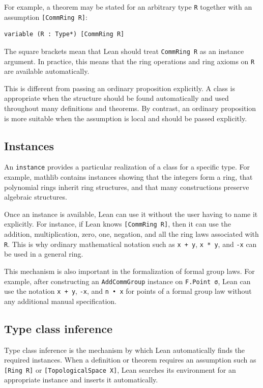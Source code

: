 For example, a theorem may be stated for an arbitrary type
\lstinline|R| together with an assumption \lstinline|[CommRing R]|:
\begin{lstlisting}
variable (R : Type*) [CommRing R]
\end{lstlisting}
The square brackets mean that Lean should treat \lstinline|CommRing R| as
an instance argument.  In practice, this means that the ring operations
and ring axioms on \lstinline|R| are available automatically.

This is different from passing an ordinary proposition explicitly.  A
class is appropriate when the structure should be found automatically and
used throughout many definitions and theorems.  By contrast, an ordinary
proposition is more suitable when the assumption is local and should be
passed explicitly.

\subsection{Instances}

An \lstinline|instance| provides a particular realization of a class for a
specific type.  For example, \textsf{mathlib} contains instances showing
that the integers form a ring, that polynomial rings inherit ring
structures, and that many constructions preserve algebraic structures.

Once an instance is available, Lean can use it without the user having to
name it explicitly.  For instance, if Lean knows \lstinline|[CommRing R]|,
then it can use the addition, multiplication, zero, one, negation, and all
the ring laws associated with \lstinline|R|.  This is why ordinary
mathematical notation such as \lstinline|x + y|, \lstinline|x * y|, and
\lstinline|-x| can be used in a general ring.

This mechanism is also important in the formalization of formal group
laws.  For example, after constructing an \lstinline|AddCommGroup|
instance on \lstinline|F.Point σ|, Lean can use the notation
\lstinline|x + y|, \lstinline|-x|, and \lstinline|n • x| for points of a
formal group law without any additional manual specification.

\subsection{Type class inference}

Type class inference is the mechanism by which Lean automatically finds
the required instances.  When a definition or theorem requires an
assumption such as \lstinline|[Ring R]| or \lstinline|[TopologicalSpace X]|,
Lean searches its environment for an appropriate instance and inserts it
automatically.

